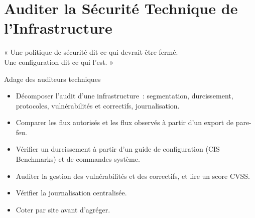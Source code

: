 
\chapter{Auditer la Sécurité Technique de l'Infrastructure}
\label{chap:audit-technique}

\epigraph{%
    « Une politique de sécurité dit ce qui devrait être fermé.\\
    Une configuration dit ce qui l'est. »%
}{Adage des auditeurs techniques}


\begin{boxobjectifs}
\begin{itemize}
    \item Décomposer l'audit d'une infrastructure~: segmentation,
          durcissement, protocoles, vulnérabilités et correctifs,
          journalisation.
    \item Comparer les flux autorisés et les flux observés à partir d'un
          export de pare-feu.
    \item Vérifier un durcissement à partir d'un guide de configuration
          (CIS Benchmarks) et de commandes système.
    \item Auditer la gestion des vulnérabilités et des correctifs, et lire
          un score CVSS.
    \item Vérifier la journalisation centralisée.
    \item Coter par site avant d'agréger.
\end{itemize}
\end{boxobjectifs}

